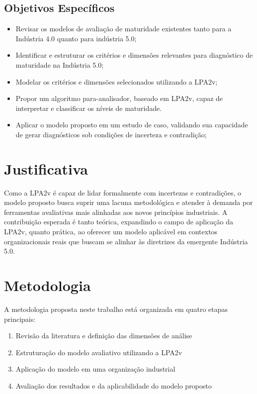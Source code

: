 \subsection{Objetivos Específicos}

\begin{itemize}
  \item Revisar os modelos de avaliação de maturidade existentes tanto para a Indústria 4.0 quanto para indústria 5.0;
  \item Identificar e estruturar os critérios e dimensões relevantes para diagnóstico de maturidade na Indústria 5.0;
  \item Modelar os critérios e dimensões selecionados utilizando a \gls{LPA2v};
  \item Propor um algoritmo para-analisador, baseado em \gls{LPA2v}, capaz de interpretar e classificar os níveis de maturidade.
  \item Aplicar o modelo proposto em um estudo de caso, validando sua capacidade de gerar diagnósticos sob condições de incerteza e contradição;
\end{itemize}

\section{Justificativa}

Como a \gls{LPA2v} é capaz  de lidar formalmente com incertezas e contradições, o modelo proposto busca suprir uma lacuna metodológica e atender à demanda por ferramentas avaliativas mais alinhadas aos novos princípios industriais.
A contribuição esperada é tanto teórica, expandindo o campo de aplicação da \gls{LPA2v}, quanto prática, ao oferecer um modelo aplicável em contextos organizacionais reais que buscam se alinhar às diretrizes da emergente Indústria 5.0.

\section{Metodologia}

A metodologia proposta neste trabalho está organizada em quatro etapas principais:
\begin{enumerate}[label=\roman*.]
    \item Revisão da literatura e definição das dimensões de análise
    \item Estruturação do modelo avaliativo utilizando a \gls{LPA2v}
    \item Aplicação do modelo em uma organização industrial
    \item Avaliação dos resultados e da aplicabilidade do modelo proposto
\end{enumerate}

